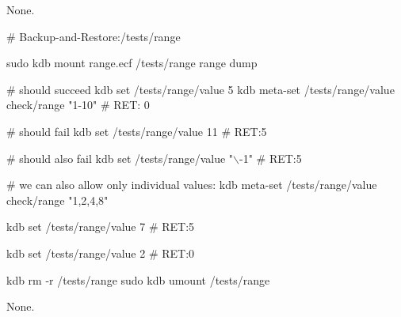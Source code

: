 None.


\begin{DoxyCode}
# Backup-and-Restore:/tests/range

sudo kdb mount range.ecf /tests/range range dump

# should succeed
kdb set /tests/range/value 5
kdb meta-set /tests/range/value check/range "1-10"
# RET: 0

# should fail
kdb set /tests/range/value 11
# RET:5

# should also fail
kdb set /tests/range/value "\(\backslash\)-1"
# RET:5

# we can also allow only individual values:
kdb meta-set /tests/range/value check/range "1,2,4,8"

kdb set /tests/range/value 7
# RET:5

kdb set /tests/range/value 2
# RET:0

kdb rm -r /tests/range
sudo kdb umount /tests/range
\end{DoxyCode}


None. 